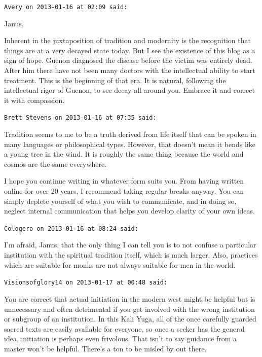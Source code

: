 \begin{footnotesize}
\begin{sffamily}
\hfill

\texttt{Avery on 2013-01-16 at 02:09 said:}

Janus,

Inherent in the juxtaposition of tradition and modernity is the recognition that things are at a very decayed state today. But I see the existence of this blog as a sign of hope. Guenon diagnosed the disease before the victim was entirely dead. After him there have not been many doctors with the intellectual ability to start treatment. This is the beginning of that era. It is natural, following the intellectual rigor of Guenon, to see decay all around you. Embrace it and correct it with compassion.

\hfill

\texttt{Brett Stevens on 2013-01-16 at 07:35 said:}

Tradition seems to me to be a truth derived from life itself that can be spoken in many languages or philosophical types. However, that doesn't mean it bends like a young tree in the wind. It is roughly the same thing because the world and cosmos are the same everywhere.

I hope you continue writing in whatever form suits you. From having written online for over 20 years, I recommend taking regular breaks anyway. You can simply deplete yourself of what you wish to communicate, and in doing so, neglect internal communication that helps you develop clarity of your own ideas.

\hfill

\texttt{Cologero on 2013-01-16 at 08:24 said:}

I'm afraid, Janus, that the only thing I can tell you is to not confuse a particular institution with the spiritual tradition itself, which is much larger. Also, practices which are suitable for monks are not always suitable for men in the world.

\hfill

\texttt{Visionsofglory14 on 2013-01-17 at 00:48 said:}

You are correct that actual initiation in the modern west might be helpful but is unnecessary and often detrimental if you get involved with the wrong institution or subgroup of an institution. In this Kali Yuga, all of the once carefully guarded sacred texts are easily available for everyone, so once a seeker has the general idea, initiation is perhaps even frivolous. That isn't to say guidance from a master won't be helpful. There's a ton to be misled by out there.


\end{sffamily}
\end{footnotesize}
